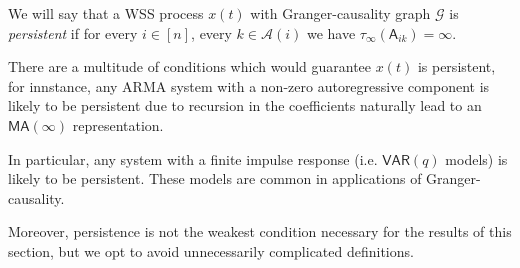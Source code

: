 \documentclass[12pt]{article}
\def\gcg{\mathcal{G}}  %
\def\A{\mathsf{A}}  %
\newcommand{\anc}[1]{\mathcal{A}(#1)}  %
\begin{document}
\begin{definition}[Persistent]
  We will say that a WSS process $x(t)$ with Granger-causality graph
  $\gcg$ is \textit{persistent} if for every $i \in [n]$, every
  $k \in \anc{i}$ we have $\tau_\infty(\A_{ik}) = \infty$.
\end{definition}

\begin{remark}
  There are a multitude of conditions which would guarantee $x(t)$ is
  persistent, for innstance, any ARMA system with a non-zero
  autoregressive component is likely to be persistent due to recursion
  in the coefficients naturally lead to an $\mathsf{MA}(\infty)$
  representation.

  In particular, any system with a finite impulse response
  (i.e. $\mathsf{VAR}(q)$ models) is likely to be persistent.  These
  models are common in applications of Granger-causality.

  Moreover, persistence is not the weakest condition necessary for the
  results of this section, but we opt to avoid unnecessarily
  complicated definitions.
\end{remark}
\end{document}
